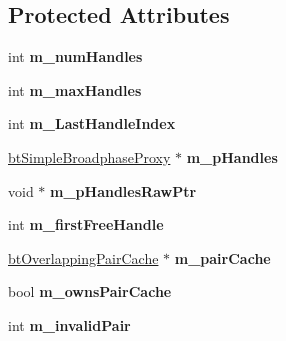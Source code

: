 \subsection*{Protected Attributes}
\begin{DoxyCompactItemize}
\item 
\hypertarget{classbt_simple_broadphase_abe4387e2ff185215472a0ef4dbf8c310}{int {\bfseries m\+\_\+num\+Handles}}\label{classbt_simple_broadphase_abe4387e2ff185215472a0ef4dbf8c310}

\item 
\hypertarget{classbt_simple_broadphase_a409bfa4f15cf3f1a754c0e241cfb4dbe}{int {\bfseries m\+\_\+max\+Handles}}\label{classbt_simple_broadphase_a409bfa4f15cf3f1a754c0e241cfb4dbe}

\item 
\hypertarget{classbt_simple_broadphase_ab0a2c912630a5b9797177bdb38617f7a}{int {\bfseries m\+\_\+\+Last\+Handle\+Index}}\label{classbt_simple_broadphase_ab0a2c912630a5b9797177bdb38617f7a}

\item 
\hypertarget{classbt_simple_broadphase_aab70cedb71cd1662adf650d91b1e3312}{\hyperlink{structbt_simple_broadphase_proxy}{bt\+Simple\+Broadphase\+Proxy} $\ast$ {\bfseries m\+\_\+p\+Handles}}\label{classbt_simple_broadphase_aab70cedb71cd1662adf650d91b1e3312}

\item 
\hypertarget{classbt_simple_broadphase_a7ae219b5e131b10e1584d4f49718205f}{void $\ast$ {\bfseries m\+\_\+p\+Handles\+Raw\+Ptr}}\label{classbt_simple_broadphase_a7ae219b5e131b10e1584d4f49718205f}

\item 
\hypertarget{classbt_simple_broadphase_a6fcaab4932baf665a5007e61ee0b0f60}{int {\bfseries m\+\_\+first\+Free\+Handle}}\label{classbt_simple_broadphase_a6fcaab4932baf665a5007e61ee0b0f60}

\item 
\hypertarget{classbt_simple_broadphase_a438263e81f6f17d3e562770a46c194db}{\hyperlink{classbt_overlapping_pair_cache}{bt\+Overlapping\+Pair\+Cache} $\ast$ {\bfseries m\+\_\+pair\+Cache}}\label{classbt_simple_broadphase_a438263e81f6f17d3e562770a46c194db}

\item 
\hypertarget{classbt_simple_broadphase_a37e38cdd49afbb2f06af879dc28cf418}{bool {\bfseries m\+\_\+owns\+Pair\+Cache}}\label{classbt_simple_broadphase_a37e38cdd49afbb2f06af879dc28cf418}

\item 
\hypertarget{classbt_simple_broadphase_a6c7cf01dfa209f2ec041a0d625f4226d}{int {\bfseries m\+\_\+invalid\+Pair}}\label{classbt_simple_broadphase_a6c7cf01dfa209f2ec041a0d625f4226d}

\end{DoxyCompactItemize}


